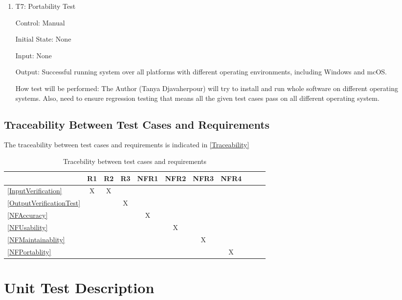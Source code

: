 \documentclass[12pt, titlepage]{article}
\begin{document}
\begin{enumerate}

  \item{T7: Portability Test\\}

  Control: Manual
  
  Initial State: None
  
  Input: None
  
  Output: Successful running system over all platforms with different operating environments, 
  including Windows and mcOS.

  How test will be performed: The Author (Tanya Djavaherpour) will try to install and run
  whole software on different operating systems. Also, need to ensure regression testing
  that means all the given test cases pass on all different operating system.
\end{enumerate}


\subsection{Traceability Between Test Cases and Requirements}

The traceability between test cases and requirements is indicated in \autoref{Traceability} 



\begin{table}[h!]
\begin{center}
\begin{tabular}{ |l|c|c|c|c|c|c|c|c|c|c}
\hline
 & R1 & R2 & R3 & NFR1 & NFR2 & NFR3 & NFR4\\
\hline
\ref{InputVerification} & X & X & & & & &\\
\hline
\ref{OutputVerificationTest} & & & X & & & &\\
\hline
\ref{NFAccuracy} & & & & X & &  & \\
\hline
\ref{NFUsability} & & & & & X & & \\
\hline
\ref{NFMaintainablity} & & & & & & X &\\
\hline
\ref{NFPortablity} & & & & & & & X\\
\hline
\end{tabular}
\caption{Tracebility between test cases and requirements}
\label{Traceability}
\end{center}
\end{table}

\section{Unit Test Description}\label{UnitTest}
\end{document}
